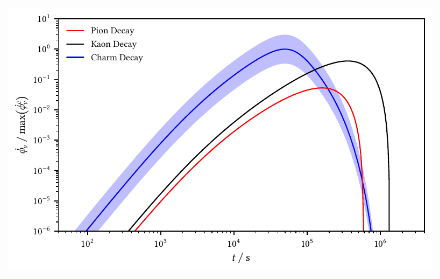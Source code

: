 \begin{figure}[H]
	\centering
	\includegraphics{../plots/build/magnetar_neutrino_spectrum_without.pdf}
	\caption[Magnetar $\nu \kern+0.5pt$ flux compared to $c$ decay without optical depth.]
			{}
	\label{fig:magnetar-flux-without}
\end{figure}
